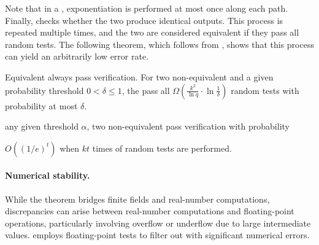 Note that in a \lax \graph, exponentiation is performed at most once along each path.
Finally, \sys checks whether the two \graphs produce identical outputs.
This process is repeated multiple times, and the two \graphs are considered equivalent if they pass all random tests.
The following theorem, which follows from , shows that this process can yield an arbitrarily low error rate.

\begin{theorem}
\label{thm:prob}
Equivalent \graphs always pass \graph verification. 
For two non-equivalent \graphs and a given probability threshold $0<\delta\leq 1$, the \graphs pass all $\Omega(\frac{k^2}{\ln q}\cdot \ln\frac{1}{\delta})$ random tests with probability at most $\delta$.
\end{theorem}

\begin{theorem}
    any given threshold $\alpha$, two non-equivalent \graphs pass \graph verification with probability 

$O((1/e)^t)$ when $kt$ times of random tests are performed.
\end{theorem}
\fi 

\paragraph{Numerical stability.} While the theorem bridges finite fields and real-number computations, discrepancies can arise between real-number computations and floating-point operations, particularly involving overflow or underflow due to large intermediate values. \sys employs floating-point tests to filter out \graphs with significant numerical errors.
